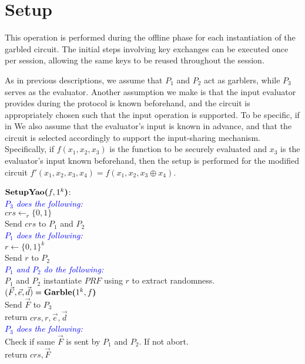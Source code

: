 \section{Setup}
\label{sec:yaobit:setup}

This operation is performed during the offline phase for each instantiation of the garbled circuit. The initial steps involving key exchanges can be executed once per session, allowing the same keys to be reused throughout the session.

As in previous descriptions, we assume that $P_1$ and $P_2$ act as garblers, while $P_3$ serves as the evaluator. Another assumption we make is that the input evaluator provides during the protocol is known beforehand, and the circuit is appropriately chosen such that the input operation is supported. To be specific, if in  We also assume that the evaluator’s input is known in advance, and that the circuit is selected accordingly to support the input-sharing mechanism. Specifically, if $f(x_1, x_2, x_3)$ is the function to be securely evaluated and $x_3$ is the evaluator’s input known beforehand, then the setup is performed for the modified circuit $f'(x_1, x_2, x_3, x_4) = f(x_1, x_2, x_3 \oplus x_4)$.

\begin{protocol}[Setup]
	$\textbf{SetupYao(}f, 1^k\textbf{)}$: \\
	\indent \textcolor{blue}{\textit{$P_3$ does the following:}} \\
	\indent $crs \gets_r \{0,1\}$ \\
	\indent Send $crs$ to $P_1$ and $P_2$ \\
	\indent \textcolor{blue}{\textit{$P_1$ does the following:}} \\
	\indent $r \gets \{0,1\}^k$ \\
	\indent Send $r$ to $P_2$ \\
	\indent \textcolor{blue}{\textit{$P_1$ and $P_2$ do the following:}} \\
	\indent $P_1$ and $P_2$ instantiate $PRF$ using $r$ to extract randomness. \\
	\indent $(\vec{F}, \vec{e}, \vec{d}) = \textbf{Garble(}1^k, f\textbf{)}$ \\
	\indent Send $\vec{F}$ to $P_3$ \\
	\indent return $crs, r, \vec{e}, \vec{d}$\\
	\indent \textcolor{blue}{\textit{$P_3$ does the following:}} \\
	\indent Check if same $\vec{F}$ is sent by $P_1$ and $P_2$. If not abort. \\
	\indent return $crs, \vec{F}$
\end{protocol}